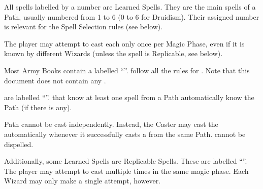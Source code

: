\begin{multicols}{2}

\begin{center}
\end{center}

All spells labelled by a number are Learned Spells. They are the main spells of a Path, usually numbered from 1 to 6 (0 to 6 for Druidism). Their assigned number is relevant for the Spell Selection rules (see below).

The player may attempt to cast each \learnedspell{} only once per Magic Phase, even if it is known by different Wizards (unless the spell is Replicable, see below).

\begin{center}
\basicsubsubtitle{\hereditaryspellnumber{} - \hereditaryspells}
\end{center}

Most Army Books contain a \hereditaryspell{} labelled \enquote{\hereditaryspellnumber}. \hereditaryspells{} follow all the rules for \learnedspells{}. Note that this document does not contain any \hereditaryspells{}.

\vspace*{\fill}
\columnbreak

\begin{center}
\basicsubsubtitle{\attributespellnumber{} - \attributespells}
\end{center}

\attributespells{} are labelled \enquote{\attributespellnumber{}}. \wizards{} that know at least one spell from a Path automatically know the Path \attributespell{} (if there is any).

Path \attributespells{} cannot be cast independently. Instead, the Caster may cast the \attributespell{} automatically whenever it successfully casts a \learnedspell{} from the same Path. \attributespells{} cannot be dispelled.

\begin{center}
\basicsubsubtitle{\textit{\replicablespellnumber} - \replicablespells}
\end{center}

Additionally, some Learned Spells are Replicable Spells. These are labelled \enquote{\replicablespellnumber}. The player may attempt to cast \replicablespells{} multiple times in the same magic phase. Each Wizard may only make a single attempt, however.

\vspace*{\fill}
\end{multicols}
\vspace*{-10pt}

